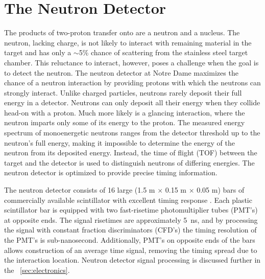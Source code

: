 \section{The Neutron Detector}
\label{sec:detector}

The products of two-proton transfer onto \GeTargets are a neutron and a \SeProducts nucleus.  The neutron, lacking charge, is not likely to interact with remaining material in the target and has only a $\sim$5\% chance of scattering from the stainless steel target chamber.  This reluctance to interact, however, poses a challenge when the goal is to detect the neutron.  The neutron detector at Notre Dame maximizes the chance of a neutron interaction by providing protons with which the neutrons can strongly interact.  Unlike charged particles, neutrons rarely deposit their full energy in a detector.  Neutrons can only deposit all their energy when they collide head-on with a proton.  Much more likely is a glancing interaction, where the neutron imparts only some of its energy to the proton.  The measured energy spectrum of monoenergetic neutrons ranges from the detector threshold up to the neutron's full energy, making it impossible to determine the energy of the neutron from its deposited energy.  Instead, the time of flight (TOF) between the target and the detector is used to distinguish neutrons of differing energies.  The neutron detector is optimized to provide precise timing information.       

The neutron detector \cite{KolataNeutwall} consists of 16 large (1.5 m $\times$ 0.15 m $\times$ 0.05 m) bars of commercially available scintillator with excellent timing response \cite{BC408}.  Each plastic scintillator bar is equipped with two fast-risetime photomultiplier tubes (PMT's) at opposite ends.  The signal risetimes are approximately 5~ns, and by processing the signal with constant fraction discriminators (CFD's) the timing resolution of the PMT's is sub-nanosecond.  Additionally, PMT's on opposite ends of the bars allows construction of an average time signal, removing the timing spread due to the interaction location.  Neutron detector signal processing is discussed further in the \sec~\ref{sec:electronics}.

